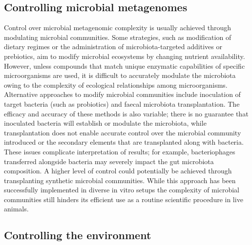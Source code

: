 \documentclass[
]{book}
\begin{document}
\hypertarget{controlling-microbial-metagenomes}{%
\subsection{Controlling microbial metagenomes}\label{controlling-microbial-metagenomes}}

Control over microbial metagenomic complexity is usually achieved through modulating microbial communities. Some strategies, such as modification of dietary regimes or the administration of microbiota-targeted additives or prebiotics, aim to modify microbial ecosystems by changing nutrient availability. However, unless compounds that match unique enzymatic capabilities of specific microorganisms are used, it is difficult to accurately modulate the microbiota owing to the complexity of ecological relationships among microorganisms. Alternative approaches to modify microbial communities include inoculation of target bacteria (such as probiotics) and faecal microbiota transplantation. The efficacy and accuracy of these methods is also variable; there is no guarantee that inoculated bacteria will establish or modulate the microbiota, while transplantation does not enable accurate control over the microbial community introduced or the secondary elements that are transplanted along with bacteria. These issues complicate interpretation of results; for example, bacteriophages transferred alongside bacteria may severely impact the gut microbiota composition. A higher level of control could potentially be achieved through transplanting synthetic microbial communities. While this approach has been successfully implemented in diverse in vitro setups the complexity of microbial communities still hinders its efficient use as a routine scientific procedure in live animals.

\hypertarget{controlling-environment}{%
\subsection{Controlling the environment}\label{controlling-environment}}
\end{document}
